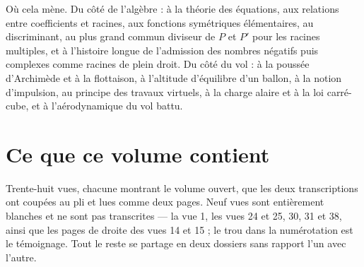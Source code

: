 \documentclass[11pt,a4paper]{article}
\begin{document}
\begin{resume}
Où cela mène. Du côté de l'algèbre : à la théorie des équations, aux relations
entre coefficients et racines, aux fonctions symétriques élémentaires, au
discriminant, au plus grand commun diviseur de $P$ et $P'$ pour les racines
multiples, et à l'histoire longue de l'admission des nombres négatifs puis
complexes comme racines de plein droit. Du côté du vol : à la poussée
d'Archimède et à la flottaison, à l'altitude d'équilibre d'un ballon, à la
notion d'impulsion, au principe des travaux virtuels, à la charge alaire et à la
loi carré-cube, et à l'aérodynamique du vol battu.

\end{resume}

\section*{Ce que ce volume contient}

Trente-huit vues, chacune montrant le volume ouvert, que les deux
transcriptions ont coupées au pli et lues comme deux pages. Neuf vues sont
entièrement blanches et ne sont pas transcrites — la vue 1, les vues 24 et 25,
30, 31 et 38, ainsi que les pages de droite des vues 14 et 15 ; le trou dans la
numérotation est le témoignage. Tout le reste se partage en deux dossiers sans
rapport l'un avec l'autre.
\end{document}
